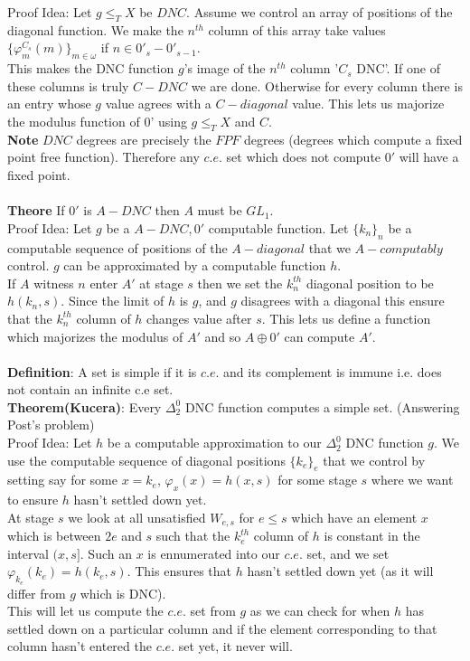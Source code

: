 \documentclass{article}
\begin{document}
	Proof Idea: Let $g\leq_T X$ be $DNC$. Assume we control an array of positions of the diagonal function. We make the $n^{th}$ column of this array take values $\{\varphi^{C_s}_m(m)\}_{m\in \omega}$ if $n \in 0'_s - 0'_{s-1}$. \\
	This makes the DNC function $g$'s image of the $n^{th}$ column '$C_s$ DNC'. If one of these columns is truly $C-DNC$ we are done. Otherwise for every column there is an entry whose $g$ value agrees with a $C-diagonal$ value. This lets us majorize the modulus function of 0' using $g \leq_T X$ and $C$.
	\\
	\textbf{Note} $DNC$ degrees are precisely the $FPF$ degrees (degrees which compute a fixed point free function). Therefore any $c.e. $ set which does not compute $0'$ will have a fixed point.\\
	\\
	\textbf{Theore} If $0'$ is $A-DNC$ then $A$ must be $GL_1$.\\
	Proof Idea: Let $g$ be a $A-DNC, 0'$ computable function. Let $\{k_n\}_n$ be a computable sequence of positions of the $A-diagonal$ that we $A-computably$ control. $g$ can be approximated by a computable function $h$.\\
	If $A$ witness $n$ enter $A'$ at stage $s$ then we set the $k_n^{th}$ diagonal position to be $h(k_n,s)$. Since the limit of $h$ is $g$, and $g$ disagrees with a diagonal this ensure that the $k_n^{th}$ column of $h$ changes value after $s$. This lets us define a function which majorizes the modulus of $A'$ and so $A\oplus 0' $ can compute $A'$.\\
	\\
	\textbf{Definition}: A set is simple if it is $c.e.$ and its complement is immune i.e. does not contain an infinite c.e set.\\
	\textbf{Theorem(Kucera)}: Every $\Delta^0_2$ DNC function computes a simple set. (Answering Post's problem)\\
	Proof Idea: Let $h$ be a computable approximation to our $\Delta^0_2$ DNC function $g$. We use the computable sequence of diagonal positions $\{k_e\}_e$ that we control by setting say for some $x = k_e$, $\varphi_x(x) = h(x,s)$ for some stage $s$ where we want to ensure $h$ hasn't settled down yet.\\
	At stage $s$ we look at all unsatisfied $W_{e,s}$ for $e\leq s$ which have an element $x$ which is between $2e$ and $s$ such that the $k_e^{th}$ column of $h$ is constant in the interval $(x,s]$. Such an $x$ is ennumerated into our $c.e.$ set, and we set $\varphi_{k_e}(k_e) = h(k_e,s)$. This ensures that $h$ hasn't settled down yet (as it will differ from $g$ which is DNC).\\
	 This will let us compute the $c.e.$ set from $g$ as we can check for when $h$ has settled down on a particular column and if the element corresponding to that column hasn't entered the $c.e.$ set yet, it never will.
	\newpage
\end{document}
